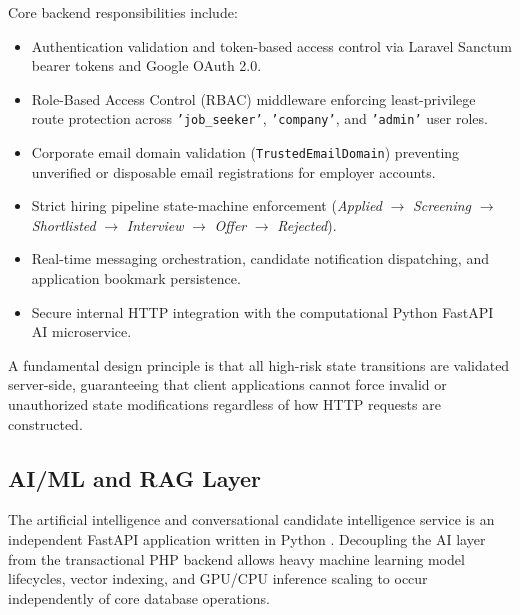 Core backend responsibilities include:
\begin{itemize}
    \item Authentication validation and token-based access control via Laravel Sanctum bearer tokens and Google OAuth 2.0.
    \item Role-Based Access Control (RBAC) middleware enforcing least-privilege route protection across \texttt{'job\_seeker'}, \texttt{'company'}, and \texttt{'admin'} user roles.
    \item Corporate email domain validation (\texttt{TrustedEmailDomain}) preventing unverified or disposable email registrations for employer accounts.
    \item Strict hiring pipeline state-machine enforcement (\textit{Applied} $\rightarrow$ \textit{Screening} $\rightarrow$ \textit{Shortlisted} $\rightarrow$ \textit{Interview} $\rightarrow$ \textit{Offer} $\rightarrow$ \textit{Rejected}).
    \item Real-time messaging orchestration, candidate notification dispatching, and application bookmark persistence.
    \item Secure internal HTTP integration with the computational Python FastAPI AI microservice.
\end{itemize}

A fundamental design principle is that all high-risk state transitions are validated server-side, guaranteeing that client applications cannot force invalid or unauthorized state modifications regardless of how HTTP requests are constructed.

\subsection{AI/ML and RAG Layer}
The artificial intelligence and conversational candidate intelligence service is an independent FastAPI application written in Python \cite{ramirez2019fastapi}. Decoupling the AI layer from the transactional PHP backend allows heavy machine learning model lifecycles, vector indexing, and GPU/CPU inference scaling to occur independently of core database operations.

